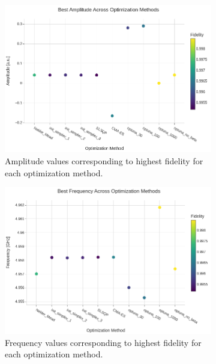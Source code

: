 \begin{figure}[h!]
    \centering
    \begin{subfigure}[t]{0.3\textwidth}
        \includegraphics[width=\textwidth]{figures/png/RB_optimization/BestAmplitude.png}
        \caption{Amplitude values corresponding to highest fidelity for each optimization method.}
        \label{fig:amplitude_best}
    \end{subfigure}
    \hfill
    \begin{subfigure}[t]{0.3\textwidth}
        \includegraphics[width=\textwidth]{figures/png/RB_optimization/BestFrequency.png}
        \caption{Frequency values corresponding to highest fidelity for each optimization method.}
        \label{fig:frequency_best}
    \end{subfigure}
    \hfill
    \begin{subfigure}[t]{0.3\textwidth}

\end{subfigure}
\end{figure}
